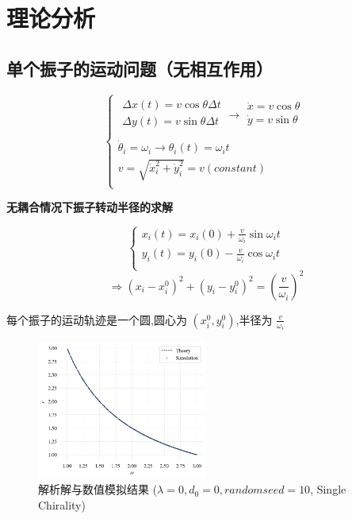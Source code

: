 \documentclass{article}
\begin{document}
\newpage
\section{理论分析}
\subsection{单个振子的运动问题（无相互作用）}

$$
\begin{cases}
	\begin{array}{c}
	\Delta x\left( t \right) =v\cos \theta \Delta t\\
	\Delta y\left( t \right) =v\sin \theta \Delta t\\
\end{array}\rightarrow \begin{array}{c}
	\dot{x}=v\cos \theta\\
	\dot{y}=v\sin \theta\\
\end{array}\\
	\dot{\theta}_i=\omega _i\rightarrow \theta _i\left( t \right) =\omega _it\\
	v=\sqrt{\dot{x}_{i}^{2}+\dot{y}_{i}^{2}}=v\left( constant \right)\\
\end{cases}
$$

\textbf{无耦合情况下振子转动半径的求解}

\begin{equation}
    \begin{cases}\label{eq:circle}
        x_i\left( t \right) =x_i\left( 0 \right) +\frac{v}{\omega _i}\sin \omega _it\\
        y_i\left( t \right) =y_i\left( 0 \right) -\frac{v}{\omega _i}\cos \omega _it\\
    \end{cases}
\end{equation}
$$
\Rightarrow \left( x_i-x_{i}^{0} \right) ^2+\left( y_i-y_{i}^{0} \right) ^2=\left( \frac{v}{\omega _i} \right) ^2
$$

每个振子的运动轨迹是一个圆,圆心为 $\left( x_i^0,y_i^0 \right)$,半径为 $\frac{v}{\omega _i}$

\begin{figure}[H]
	\centering
	\includegraphics[width=0.5\textwidth]{./figs/noCouplingRadius.png}
	\caption{解析解与数值模拟结果 ($\lambda=0, d_0=0, random seed=10$, Single Chirality)}
	\label{fig:fig21.1}
\end{figure}
\end{document}

